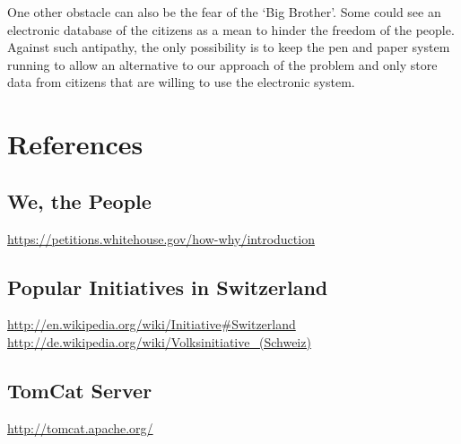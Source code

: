 \documentclass[12pt,letter,titlepage]{article}
\begin{document}
One other obstacle can also be the fear of the `Big Brother'. Some could see an electronic database of the citizens as a mean to hinder the freedom of the people. Against such antipathy, the only possibility is to keep the pen and paper system running to allow an alternative to our approach of the problem and only store data from citizens that are willing to use the electronic system.

\section{References}

\subsection*{We, the People}

\url{https://petitions.whitehouse.gov/how-why/introduction}

\subsection*{Popular Initiatives in Switzerland}

\url{http://en.wikipedia.org/wiki/Initiative#Switzerland}\\
\url{http://de.wikipedia.org/wiki/Volksinitiative_(Schweiz)}
 

\subsection*{TomCat Server}
\url{http://tomcat.apache.org/}
\end{document}
